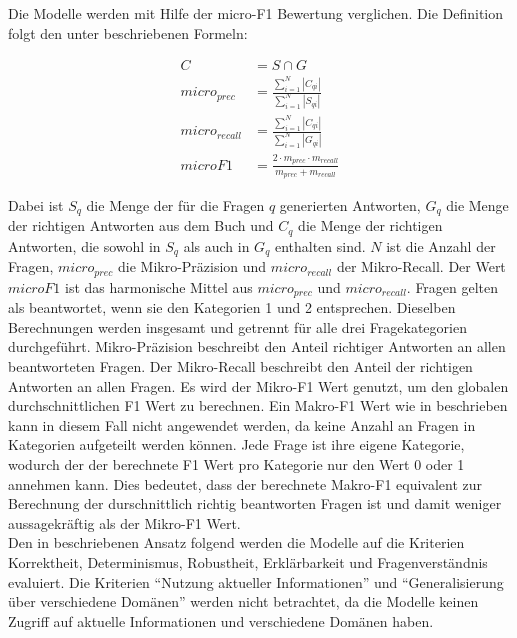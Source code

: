 Die Modelle werden mit Hilfe der micro-F1 Bewertung verglichen.
Die Definition folgt den unter \citet{chatgpt_qas} beschriebenen Formeln:
\begin{ceqn}
\begin{align}
    C &= S \cap G \\
    micro_{prec} &= \frac{\sum_{i=1}^{N}|C_{qi}|}{\sum_{i=1}^{N}|S_{qi}|} \\
    micro_{recall} &= \frac{\sum_{i=1}^{N}|C_{qi}|}{\sum_{i=1}^{N}|G_{qi}|} \\
    microF1 &= \frac{2 \cdot m_{prec} \cdot m_{recall}}{m_{prec} + m_{recall}}
\end{align}
\end{ceqn}
Dabei ist $S_q$ die Menge der für die Fragen $q$ generierten Antworten, $G_q$ die Menge der richtigen Antworten aus dem Buch \citet{bb} und $C_q$ die Menge der richtigen Antworten, die sowohl in $S_q$ als auch in $G_q$ enthalten sind.
$N$ ist die Anzahl der Fragen, $micro_{prec}$ die Mikro-Präzision und $micro_{recall}$ der Mikro-Recall.
Der Wert $microF1$ ist das harmonische Mittel aus $micro_{prec}$ und $micro_{recall}$.
Fragen gelten als beantwortet, wenn sie den Kategorien 1 und 2 entsprechen.
Dieselben Berechnungen werden insgesamt und getrennt für alle drei Fragekategorien durchgeführt.
Mikro-Präzision beschreibt den Anteil richtiger Antworten an allen beantworteten Fragen.
Der Mikro-Recall beschreibt den Anteil der richtigen Antworten an allen Fragen.
Es wird der Mikro-F1 Wert genutzt, um den globalen durchschnittlichen F1 Wert zu berechnen.
Ein Makro-F1 Wert wie in \citet{qald9} beschrieben kann in diesem Fall nicht angewendet werden, da keine Anzahl an Fragen in Kategorien aufgeteilt werden können. Jede Frage ist ihre eigene Kategorie, wodurch der der berechnete F1 Wert pro Kategorie nur den Wert 0 oder 1 annehmen kann. Dies bedeutet, dass der berechnete Makro-F1 equivalent zur Berechnung der durschnittlich richtig beantworten Fragen ist und damit weniger aussagekräftig als der Mikro-F1 Wert.\\

Den in \citet{chatgpt_qas} beschriebenen Ansatz folgend werden die Modelle auf die Kriterien Korrektheit, Determinismus, Robustheit, Erklärbarkeit und Fragenverständnis evaluiert.
Die Kriterien \enquote{Nutzung aktueller Informationen} und \enquote{Generalisierung über verschiedene Domänen} werden nicht betrachtet, da die Modelle keinen Zugriff auf aktuelle Informationen und verschiedene Domänen haben.\\

